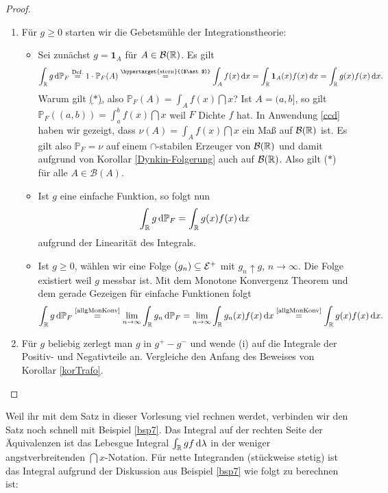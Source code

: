 \begin{proof}\abs
	\begin{enumerate}[label=(\roman*)]
		\item F\"ur $g\geq 0$ starten wir die Gebetsm\"uhle der Integrationstheorie:
		\begin{itemize}
			\item  Sei zun\"achst $g = \mathbf{1}_A$ für $A \in \mathcal{B}(\mathbb{R})$. Es gilt
			\begin{align*}
				\int_{\R} g \dint \mathbb{P}_F\overset{\text{Def.}}{ =} 1 \cdot \mathbb{P}_F(A) \overset{\text{\hypertarget{stern}{($\ast$)}}}{=} \int_{A} f(x) \dint x = \int_{\R} \mathbf{1}_A (x) f(x)\,dx = \int_{\R} g(x) f(x) \dint x.
			\end{align*}
			Warum gilt \hyperlink{stern}{($\ast$)}, also $ \mathbb{P}_F(A) = \int_{A} f(x) \dint x$? Ist $A = (a,b]$, so gilt $\mathbb{P}_F((a,b)) = \int_{a}^{b} f(x) \dint x$ weil $F$ Dichte $f$ hat. In Anwendung \ref{ccd} haben wir gezeigt, dass $\nu(A) = \int_{A} f(x) \dint x$ ein Maß auf $\mathcal{B}(\mathbb{R})$ ist. Es gilt also $\mathbb{P}_F = \nu$ auf einem $\cap$-stabilen Erzeuger von $\mathcal B(\mathbb{R})$ und damit aufgrund von Korollar \ref{Dynkin-Folgerung} auch auf $\mathcal B(\mathbb{R})$. Also gilt  ($\ast$) f\"ur alle $A\in \mathcal B(A)$.
			\item Ist $g$ eine einfache Funktion, so folgt nun \[ \int_{\mathbb{R}}g \, \mathrm{d} \mathbb{P}_F = \int_{\mathbb{R}} g(x)f(x) \, \mathrm{d} x\] aufgrund der Linearit\"at des Integrals.
			\item Ist $g \geq 0$, wählen wir eine Folge $(g_n) \subseteq \mathcal{E}^+$ mit $g_n \uparrow g$, $n \to \infty$. Die Folge existiert weil $g$ messbar ist. Mit dem Monotone Konvergenz Theorem und dem gerade Gezeigen f\"ur einfache Funktionen folgt \[ \int_{\mathbb{R}}g \, \mathrm{d} \mathbb{P}_F \overset{\text{\ref{allgMonKonv}}}{=} \lim\limits_{n \to \infty} \int_{\mathbb{R}} g_n \, \mathrm{d} \mathbb{P}_F = \lim\limits_{n \to \infty} \int_{\mathbb{R}} g_n(x) f(x) \, \mathrm{d} x \overset{\text{\ref{allgMonKonv}}}{=} \int_{\mathbb{R}} g(x) f(x) \, \mathrm{d} x. \]
		\end{itemize}		
		\item Für $g$ beliebig zerlegt man $g$ in $g^+ - g^-$ und wende (i) auf die Integrale der Positiv- und Negativteile an. Vergleiche den Anfang des Beweises von Korollar \ref{korTrafo}. 
	\end{enumerate}
\end{proof}
Weil ihr mit dem Satz in dieser Vorlesung viel rechnen werdet, verbinden wir den Satz noch schnell mit Beispiel \ref{bsp7}. Das Integral auf der rechten Seite der \"Aquivalenzen ist das Lebesgue Integral $\int_{\mathbb{R}} g f \, \mathrm{d} \lambda$ in der weniger angstverbreitenden $\dint x$-Notation. F\"ur nette Integranden (st\"uckweise stetig) ist das Integral aufgrund der Diskussion aus Beispiel \ref{bsp7} wie folgt zu berechnen ist:
